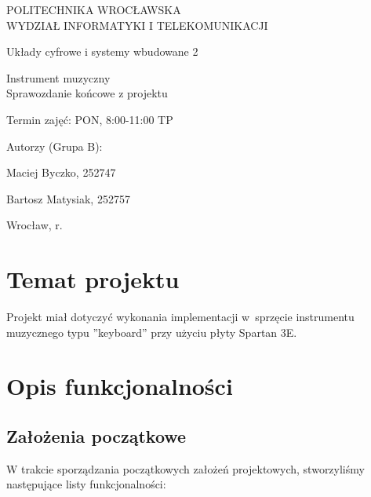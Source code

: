 \documentclass{article}
\begin{document}
\begin{titlepage}
    \begin{center}\LARGE POLITECHNIKA WROCŁAWSKA \\ WYDZIAŁ INFORMATYKI I TELEKOMUNIKACJI \end{center}
    \vspace{57pt}
    \begin{center} \Huge Układy cyfrowe i systemy wbudowane 2 \end{center}
    \vspace{35pt}
    \begin{center} \LARGE Instrument muzyczny \\ Sprawozdanie końcowe z projektu \end{center}
    \vspace{40pt}
    \begin{flushleft}\Large Termin zajęć: PON, 8:00-11:00 TP   \end{flushleft}
    \vspace{15pt}
    \begin{paracol}{2}
        \raggedright{\Large Autorzy (Grupa B):} \switchcolumn {} \switchcolumn
        \raggedright{\Large Maciej Byczko, 252747} \switchcolumn {} \switchcolumn
        \raggedright{\Large Bartosz Matysiak, 252757} 
    \end{paracol}
    \vspace{150pt}
    \begin{center}Wrocław, \the\year{}r.\end{center}
\end{titlepage}



\section{Temat projektu}

Projekt miał dotyczyć wykonania implementacji w~sprzęcie instrumentu muzycznego typu ''keyboard'' przy użyciu płyty Spartan 3E.

\section{Opis funkcjonalności} %

\subsection{Założenia początkowe}
W trakcie sporządzania początkowych założeń projektowych, stworzyliśmy następujące listy funkcjonalności:
\end{document}
